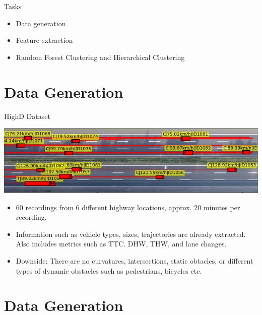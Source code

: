\documentclass[shortpres]{beamer}
\begin{document}
\begin{frame}{Tasks}	

\begin{itemize} 
\item Data generation
\vfill \item Feature extraction
\vfill \item Random Forest Clustering and Hierarchical Clustering
\end{itemize}
\end{frame}

\section{Data Generation}	

\begin{frame}{HighD Dataset}	

\includegraphics[width=\textwidth]{highd-example}

\begin{itemize} 
\item 60 recordings from 6 different highway locations, approx. 20 minutes per recording.
\vfill \item Information such as vehicle types, sizes, trajectories are already extracted. Also includes metrics such as TTC. DHW, THW, and lane changes.
\vfill \item Downside: There are no curvatures, intersections, static obtacles, or different types of dynamic obstacles such as pedestrians, bicycles etc.
\end{itemize}

\end{frame}


\section{Data Generation}	
\end{document}
